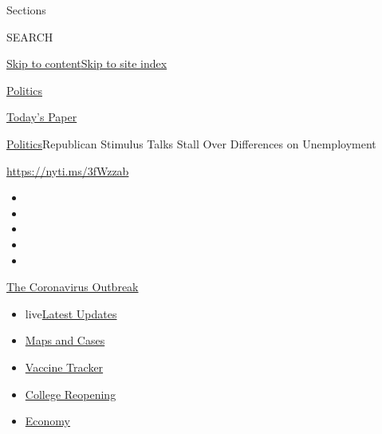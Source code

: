 Sections

SEARCH

\protect\hyperlink{site-content}{Skip to
content}\protect\hyperlink{site-index}{Skip to site index}

\href{https://www.nytimes3xbfgragh.onion/section/politics}{Politics}

\href{https://myaccount.nytimes3xbfgragh.onion/auth/login?response_type=cookie\&client_id=vi}{}

\href{https://www.nytimes3xbfgragh.onion/section/todayspaper}{Today's
Paper}

\href{/section/politics}{Politics}\textbar{}Republican Stimulus Talks
Stall Over Differences on Unemployment

\url{https://nyti.ms/3fWzzab}

\begin{itemize}
\item
\item
\item
\item
\item
\end{itemize}

\href{https://www.nytimes3xbfgragh.onion/news-event/coronavirus?action=click\&pgtype=Article\&state=default\&region=TOP_BANNER\&context=storylines_menu}{The
Coronavirus Outbreak}

\begin{itemize}
\tightlist
\item
  live\href{https://www.nytimes3xbfgragh.onion/2020/08/04/world/coronavirus-covid-19.html?action=click\&pgtype=Article\&state=default\&region=TOP_BANNER\&context=storylines_menu}{Latest
  Updates}
\item
  \href{https://www.nytimes3xbfgragh.onion/interactive/2020/us/coronavirus-us-cases.html?action=click\&pgtype=Article\&state=default\&region=TOP_BANNER\&context=storylines_menu}{Maps
  and Cases}
\item
  \href{https://www.nytimes3xbfgragh.onion/interactive/2020/science/coronavirus-vaccine-tracker.html?action=click\&pgtype=Article\&state=default\&region=TOP_BANNER\&context=storylines_menu}{Vaccine
  Tracker}
\item
  \href{https://www.nytimes3xbfgragh.onion/2020/08/02/us/covid-college-reopening.html?action=click\&pgtype=Article\&state=default\&region=TOP_BANNER\&context=storylines_menu}{College
  Reopening}
\item
  \href{https://www.nytimes3xbfgragh.onion/live/2020/08/03/business/stock-market-today-coronavirus?action=click\&pgtype=Article\&state=default\&region=TOP_BANNER\&context=storylines_menu}{Economy}
\end{itemize}

